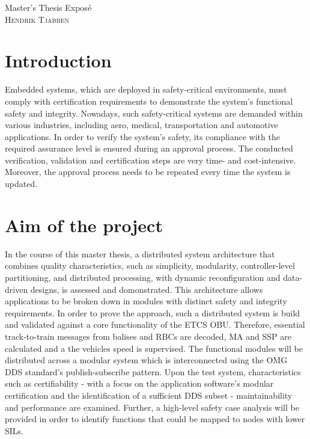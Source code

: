 \documentclass[a4paper, 12pt]{scrartcl}
\begin{document}
\begin{center}
  \Huge{Master's Thesis Expos\'{e}}\\
  \large{\textsc{Hendrik Tjabben}}
\end{center}

\section*{Introduction}
Embedded systems, which are deployed in safety-critical environments, must comply with certification requirements to demonstrate the system's functional safety and integrity.
Nowadays, such safety-critical systems are demanded within various industries, including aero, medical, transportation and automotive applications.
In order to verify the system's safety, its compliance with the required assurance level is ensured during an approval process.
The conducted verification, validation and certification steps are very time- and cost-intensive.
Moreover, the approval process needs to be repeated every time the system is updated.

\section*{Aim of the project}
In the course of this master thesis, a distributed system architecture that combines quality characteristics, such as simplicity, modularity, control\-ler-level partitioning, and distributed processing, with dynamic reconfiguration and data-driven designs, is assessed and domonstrated.
This architecture allows applications to be broken down in modules with distinct safety and integrity requirements.
In order to prove the approach, such a distributed system is build and validated against a core functionality of the \ac{ETCS OBU}.
Therefore, essential track-to-train messages from balises and \acp{RBC} are decoded, \ac{MA} and \ac{SSP} are calculated and a the vehicles speed is supervised.
The functional modules will be distributed across a modular system which is interconnected using the \ac{OMG} \ac{DDS} standard's publish-subscribe pattern.
Upon the test system, characteristics such as certifiability - with a focus on the application software's modular certification and the identification of a sufficient \ac{DDS} subset - maintainability and performance are examined.
Further, a high-level safety case analysis will be provided in order to identify functions that could be mapped to nodes with lower \acp{SIL}.
\end{document}
